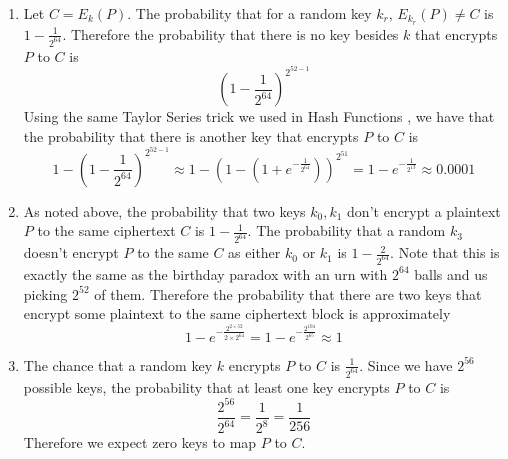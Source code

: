 \begin{enumerate}
    \item Let $C = E_k(P)$. The probability that for a random key $k_r$, $E_{k_r}(P) \neq C$ is $1-\frac{1}{2^{64}}$. Therefore the probability that there is no key besides $k$ that encrypts $P$ to $C$ is \[\left(1 - \frac{1}{2^{64}}\right)^{2^{52-1}}\] Using the same Taylor Series trick we used in Hash Functions \cite{Slides_37}, we have that the probability that there is another key that encrypts $P$ to $C$ is
    \[1 - \left(1 - \frac{1}{2^{64}}\right)^{2^{52-1}} \approx 1 - \left(1 - (1 + e^{-\frac{1}{2^{64}}})\right)^{2^{51}} = 1 - e^{-\frac{1}{2^{13}}} \approx 0.0001\]
    \item As noted above, the probability that two keys $k_0, k_1$ don't encrypt a plaintext $P$ to the same ciphertext $C$ is $1 - \frac{1}{2^{64}}$. The probability that a random $k_3$ doesn't encrypt $P$ to the same $C$ as either $k_0$ or $k_1$ is $1 - \frac{2}{2^{64}}$. Note that this is exactly the same as the birthday paradox \cite{Slides_44} with an urn with $2^{64}$ balls and us picking $2^{52}$ of them. Therefore the probability that there are two keys that encrypt some
    plaintext to the same ciphertext block is approximately \[1 - e^{-\frac{2^{2 \times 52}}{2 \times 2^{64}}} = 1 - e^{-\frac{2^{104}}{2^{65}}} \approx 1\]
    \item The chance that a random key $k$ encrypts $P$ to $C$ is $\frac{1}{2^{64}}$. Since we have $2^{56}$ possible keys, the probability that at least one key encrypts $P$ to $C$ is \[\frac{2^{56}}{2^{64}} = \frac{1}{2^8} = \frac{1}{256}\] Therefore we expect zero keys to map $P$ to $C$. 
\end{enumerate}
